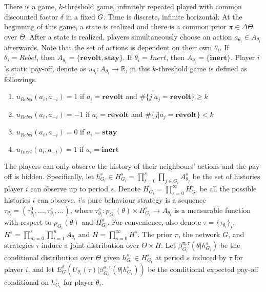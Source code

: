 \documentclass[12pt,letter]{article}
\theoremstyle{definition}
\theoremstyle{remark}
\theoremstyle{claim}
\begin{document}
There is a game, $k$-threshold game, infinitely repeated played with common discounted factor $\delta$ in a fixed $G$. Time is discrete, infinite horizontal. At the beginning of this game, a state is realized and there is a common prior $\pi\in \Delta \Theta$ over $\Theta$. After a state is realized, players simultaneously choose an action $a_{\theta_i}\in A_{\theta_i}$ afterwards. Note that the set of actions is dependent on their own $\theta_i$. If $\theta_i=Rebel$, then $A_{\theta_i}=\{\textbf{revolt}, \textbf{stay}\}$.  If $\theta_i=Inert$, then $A_{\theta_i}=\{\textbf{inert}\}$. Player $i$'s static pay-off, denote as $u_{\theta_i}: A_{\theta_i}\rightarrow \mathbb{R}$, in this $k$-threshold game is defined as followings. 
\begin{enumerate}
\item $u_{Rebel}(a_i,a_{-i})=1$ if $a_i=\textbf{revolt}$ and $\#\{j|a_j=\textbf{revolt}\}\geq k$
\item $u_{Rebel}(a_i,a_{-i})=-1$ if $a_i=\textbf{revolt}$ and $\#\{j|a_j=\textbf{revolt}\}< k$
\item $u_{Rebel}(a_i,a_{-i})=0$ if $a_i=\textbf{stay}$
\item $u_{Inert}(a_i,a_{-i})=1$ if $a_i=\textbf{inert}$
\end{enumerate}

The players can only observe the history of their neighbours' actions and the pay-off is hidden. Specifically, let $h^s_{G_i}\in H^s_{G_i}=\prod^s_{t=0}\prod_{j\in G_i}A^s_{\theta_j}$ be the set of histories player $i$ can observe up to period $s$. Denote $H_{G_i}=\prod^{\infty}_{s=0}H^s_{G_i}$ be all the possible histories $i$ can observe. $i$'s pure behaviour strategy is a sequence $\tau_{\theta_i}=(\tau^0_{\theta_i},...,\tau^s_{\theta_i},...)$, where $\tau^s_{\theta_i}: p_{G_i}(\theta)\times H^s_{G_i}\rightarrow A_{\theta_i}$ is a  measurable function with respect to $p_{G_i}(\theta)$ and $H^s_{G_i}$. For convenience, also denote $\tau=\{\tau_{\theta_i}\}_i$,  $H^s=\prod^s_{m=0}\prod^n_{i=1}A_{\theta_i}$ and $H=\prod^{\infty}_{s=0}H^s$. The prior $\pi$, the network $G$, and strategies $\tau$ induce a joint distribution over $\Theta\times H$. Let 
$\beta^{\pi,\tau}_{G_i}(\theta|h^{s}_{G_i})$
be the conditional distribution over $\Theta$ given $h^{s}_{G_i}\in H^s_{G_i}$ at period $s$ induced by $\tau$ for player $i$, and let
$E^{\delta}_G(U_{\theta_i}(\tau)|\beta^{\pi,\tau}_{G_i}(\theta|h^{s}_{G_i}))$
be the conditional expected pay-off conditional on $h^{s}_{G_i}$ for player ${\theta_i}$.
\end{document}
